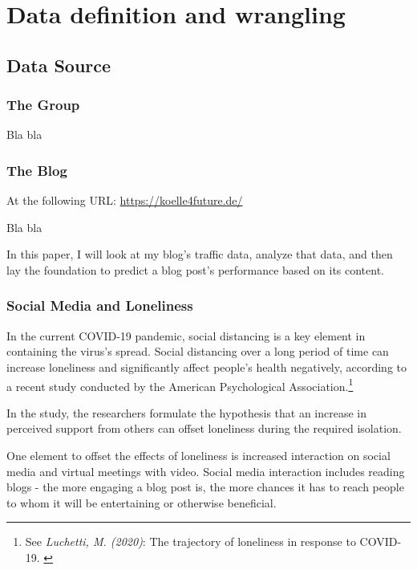 %
%

\pagebreak
\section{Data definition and wrangling}

\onehalfspacing

\subsection{Data Source}

\subsubsection{The Group}

Bla bla

\subsubsection{The Blog}

At the following URL: \url{https://koelle4future.de/}

Bla bla

In this paper, I will look at my blog's traffic data, analyze that data, and then lay the foundation to predict a blog post's performance based on its content.

\subsubsection{Social Media and Loneliness}

In the current COVID-19 pandemic, social distancing is a key element in containing the virus's spread. Social distancing over a long period of time can increase loneliness and significantly affect people's health negatively, according to a recent study conducted by the American Psychological Association.\footnote{See \textit{Luchetti, M. (2020)}: The trajectory of loneliness in response to COVID-19. \cite{apaLoneliness}}

In the study, the researchers formulate the hypothesis that an increase in perceived support from others can offset loneliness during the required isolation.

One element to offset the effects of loneliness is increased interaction on social media and virtual meetings with video. Social media interaction includes reading blogs - the more engaging a blog post is, the more chances it has to reach people to whom it will be entertaining or otherwise beneficial.


